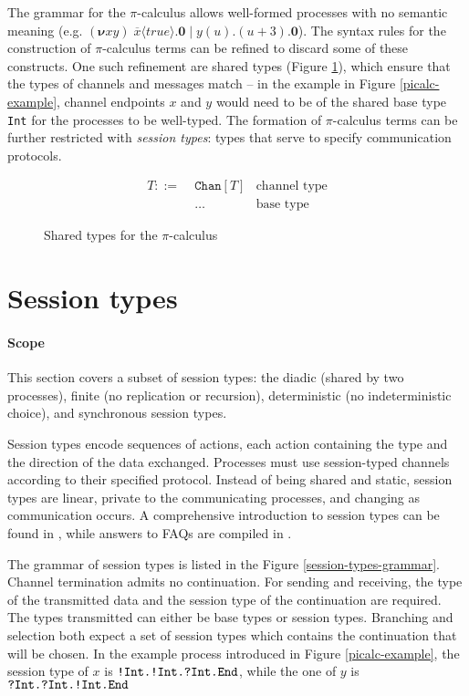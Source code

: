 \documentclass{mproj}
\newcommand{\PO}{\mathbf{0}}
\newcommand{\comp}[2]{#1 \mid #2}
\newcommand{\new}[2]{(\boldsymbol{\nu} #1 #2) \;}
\newcommand{\cout}[2]{\overline{#1}\langle#2\rangle.}
\newcommand{\cin}[2]{#1(#2).}
\newcommand{\picalc}{$\pi$-calculus}
\newcommand{\type}{\texttt}
\newcommand{\End}{\type{End}}
\newcommand{\Send}[1]{!#1.}
\newcommand{\Recv}[1]{?#1.}
\begin{document}
The grammar for the \picalc{} allows well-formed processes with no semantic meaning (e.g. $\new{x}{y} \comp {\cout{x}{true}\PO} {\cin{y}{u}(u+3).\PO}$). The syntax rules for the construction of \picalc{} terms can be refined to discard some of these constructs. One such refinement are shared types (Figure \ref{picalc-shared-types}), which ensure that the types of channels and messages match -- in the example in Figure \ref{picalc-example}, channel endpoints $x$ and $y$ would need to be of the shared base type \type{Int} for the processes to be well-typed. The formation of \picalc{} terms can be further restricted with \emph{session types}: types that serve to specify communication protocols.

\begin{figure}[H]
    \begin{align*}
    T ::= \; &\type{Chan}[T] & \text{channel type} \\
             &\ldots         & \text{base type}
    \end{align*}
    \caption{Shared types for the \picalc{}}
    \label{picalc-shared-types}
\end{figure}

\section{Session types}\label{session-types}

\paragraph{Scope} This section covers a subset of session types: the diadic (shared by two processes), finite (no replication or recursion), deterministic (no indeterministic choice), and synchronous session types.

Session types \cite{Honda1993, Takeuchi1994, Honda1998} encode sequences of actions, each action containing the type and the direction of the data exchanged.  Processes must use session-typed channels according to their specified protocol.  Instead of being shared and static, session types are linear, private to the communicating processes, and changing as communication occurs. A comprehensive introduction to session types can be found in \cite{Vasconcelos2009}, while answers to FAQs are compiled in \cite{Dezani-ciancaglini2010}.

The grammar of session types is listed in the Figure \ref{session-types-grammar}. Channel termination admits no continuation. For sending and receiving, the type of the transmitted data and the session type of the continuation are required. The types transmitted can either be base types or session types. Branching and selection both expect a set of session types which contains the continuation that will be chosen. In the example process introduced in Figure \ref{picalc-example}, the session type of $x$ is $\type{\Send{Int}\Send{Int}\Recv{Int}\End}$, while the one of $y$ is $\type{\Recv{Int}\Recv{Int}\Send{Int}\End}$
\end{document}
